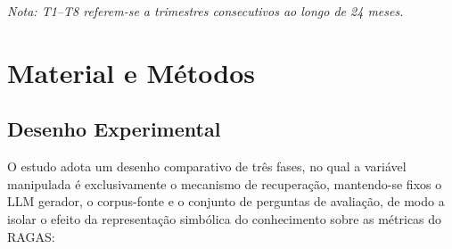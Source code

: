 \documentclass{article}
\begin{document}
\begin{table}[h]
	\centering
\end{table}

\noindent \textit{Nota: T1--T8 referem-se a trimestres consecutivos ao longo de 24 meses.}

\newpage

\section{Material e Métodos}

\subsection{Desenho Experimental}

O estudo adota um desenho comparativo de três fases, no qual a variável manipulada é exclusivamente o mecanismo de recuperação, mantendo-se fixos o LLM gerador, o corpus-fonte e o conjunto de perguntas de avaliação, de modo a isolar o efeito da representação simbólica do conhecimento sobre as métricas do RAGAS:
\end{document}
